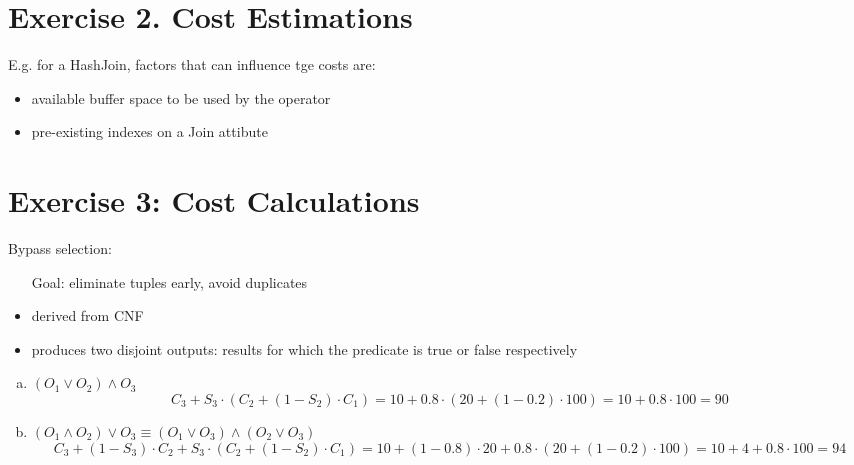 \documentclass[a4paper]{article}
\begin{document}
	\section*{Exercise 2. Cost Estimations}\label{sec:exercise2}
	E.g. for a HashJoin, factors that can influence tge costs are:
	\begin{itemize}
        \item available buffer space to be used by the operator
        \item pre-existing indexes on a Join attibute
	\end{itemize}


	\section*{Exercise 3: Cost Calculations}\label{sec:exercise3}
        Bypass selection: 
        \begin{itemize}
            \item[Goal:] eliminate tuples early, avoid duplicates
            \item derived from CNF 
            \item produces two disjoint outputs: results for which the predicate is true or false respectively
        \end{itemize}
        \begin{enumerate}[a.]
            \item $(O_1 \vee O_2) \wedge O_3$ \\
            \[ C_3 + S_3 \cdot (C_2 + (1 - S_2) \cdot C_1) = 10 + 0.8 \cdot (20 + (1-0.2) \cdot 100) = 10 + 0.8 \cdot 100 = 90 \]
            \item $(O_1 \wedge O_2) \vee O_3 \equiv (O_1 \vee O_3) \wedge (O_2 \vee O_3)$ \\
            \[ C_3 + (1 - S_3) \cdot C_2 + S_3 \cdot (C_2 + (1 - S_2) \cdot C_1) = 10 + (1 - 0.8) \cdot 20 + 0.8 \cdot (20 + (1-0.2) \cdot 100) = 10 + 4 + 0.8 \cdot 100 = 94 \]
        \end{enumerate}
        
\end{document}
